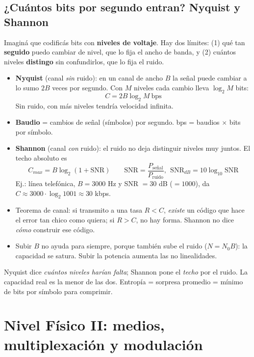 \documentclass[10pt,a4paper]{article}
\newcommand{\term}[1]{\textbf{\color{azul}#1}}
\begin{document}
\subsection{¿Cuántos bits por segundo entran? Nyquist y Shannon}
\begin{idea}
Imaginá que codificás bits con \textbf{niveles de voltaje}. Hay dos límites:
(1) qué tan \textbf{seguido} puedo cambiar de nivel, que lo fija el ancho de banda, y
(2) cuántos niveles \textbf{distingo} sin confundirlos, que lo fija el ruido.
\end{idea}
\begin{itemize}
  \item \term{Nyquist} (canal \emph{sin} ruido): en un canal de ancho $B$ la señal puede cambiar a lo sumo $2B$ veces por segundo. Con $M$ niveles cada cambio lleva $\log_2 M$ bits:
        \[ C = 2B\log_2 M \ \text{bps} \]
        Sin ruido, con más niveles tendría velocidad infinita.
  \item \term{Baudio} = cambios de señal (símbolos) por segundo. bps = baudios $\times$ bits por símbolo.
  \item \term{Shannon} (canal \emph{con} ruido): el ruido no deja distinguir niveles muy juntos. El techo absoluto es
        \[ C_{max} = B\log_2(1+\text{SNR}) \qquad \text{SNR} = \frac{P_{\text{señal}}}{P_{\text{ruido}}},\ \ \text{SNR}_{dB} = 10\log_{10}\text{SNR} \]
        Ej.: línea telefónica, $B = 3000$ Hz y SNR $= 30$ dB ($=1000$), da $C \approx 3000\cdot\log_2 1001 \approx 30$ kbps.
  \item Teorema de canal: si transmito a una tasa $R < C$, \emph{existe} un código que hace el error tan chico como quiera; si $R > C$, no hay forma. Shannon no dice \emph{cómo} construir ese código.
  \item Subir $B$ no ayuda para siempre, porque también sube el ruido ($N = N_0 B$): la capacidad se satura. Subir la potencia aumenta las no linealidades.
\end{itemize}
\begin{clave}
Nyquist dice \emph{cuántos niveles harían falta}; Shannon pone el \emph{techo} por el ruido. La capacidad real es la menor de las dos.
Entropía = sorpresa promedio = mínimo de bits por símbolo para comprimir.
\end{clave}

\section{Nivel Físico II: medios, multiplexación y modulación}
\end{document}
